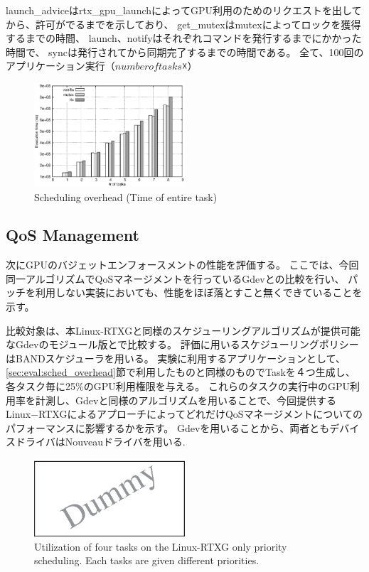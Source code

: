 
launch\_adviceはrtx\_gpu\_launchによってGPU利用のためのリクエストを出してから、許可がでるまでを示しており、
get\_mutexはmutexによってロックを獲得するまでの時間、
launch、notifyはそれぞれコマンドを発行するまでにかかった時間で、
syncは発行されてから同期完了するまでの時間である。
全て、100回のアプリケーション実行（$number of tasks ☓$）

\begin{figure}[t]
\begin{center}
\includegraphics[width=0.5\textwidth]{img/sum_task.eps}
\caption{Scheduling overhead (Time of entire task)}
\end{center}
\label{fig:fp_overhead}
\end{figure}


\subsection{QoS Management}

次にGPUのバジェットエンフォースメントの性能を評価する。
ここでは、今回同一アルゴリズムでQoSマネージメントを行っているGdevとの比較を行い、
パッチを利用しない実装においても、性能をほぼ落とすこと無くできていることを示す。

比較対象は、本Linux-RTXGと同様のスケジューリングアルゴリズムが提供可能なGdevのモジュール版とで比較する。
評価に用いるスケジューリングポリシーはBANDスケジューラを用いる。
実験に利用するアプリケーションとして、\ref{sec:eval:sched_overhead}節で利用したものと同様のものでTaskを４つ生成し、各タスク毎に25\%のGPU利用権限を与える。
これらのタスクの実行中のGPU利用率を計測し、Gdevと同様のアルゴリズムを用いることで、今回提供するLinux−RTXGによるアプローチによってどれだけQoSマネージメントについてのパフォーマンスに影響するかを示す。
Gdevを用いることから、両者ともデバイスドライバはNouveauドライバを用いる.


\begin{figure}[t]
\begin{center}
\includegraphics[width=0.5\textwidth]{img/dummy}
\caption{Utilization of four tasks on the Linux-RTXG only priority scheduling. Each tasks are given different priorities.}
\end{center}
\label{fig:qos_rtx}
\end{figure}

